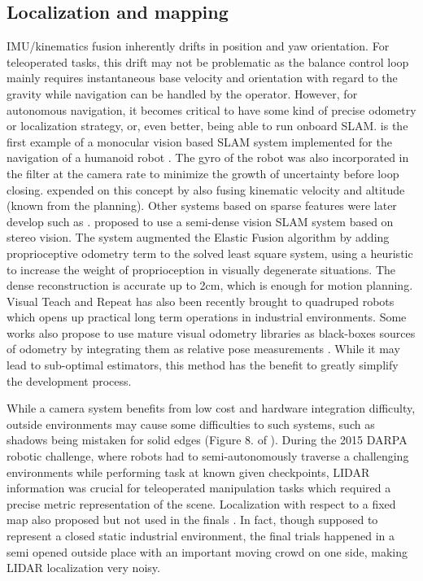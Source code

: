\subsection{Localization and mapping}
IMU/kinematics fusion inherently drifts in position and yaw orientation. For teleoperated tasks, this drift may not be problematic as the balance control loop
mainly requires instantaneous base velocity and orientation with regard to the gravity while navigation can be handled by the operator. However, for autonomous
navigation, it becomes critical to have some kind of precise odometry or localization strategy, or, even better, being able to run onboard SLAM. 
\cite{davison2007monoslam} is the first example of a monocular vision based SLAM system implemented for the navigation of a humanoid robot . The gyro of the robot
was also incorporated in the filter at the camera rate to minimize the growth of uncertainty before loop closing. \cite{stasse2006real} expended on this concept by also fusing
kinematic velocity and altitude (known from the planning). Other systems based on sparse features were later develop such as \cite{ahn2012board, oriolo2012vision, oriolo2016humanoid, kwak20093d}.
\cite{scona2017direct} proposed to use a semi-dense vision SLAM system based on stereo vision. The system augmented the Elastic Fusion \cite{whelan2016elasticfusion} algorithm by adding 
proprioceptive odometry term to the solved least square system, using a heuristic to increase the weight of proprioception in visually degenerate situations. The 
dense reconstruction is accurate up to 2cm, which is enough for motion planning. Visual Teach and Repeat \cite{furgale2010visual} has also been recently brought to quadruped 
robots \cite{mattamala2021learning} which opens up practical long term operations in industrial environments. Some works also propose to use mature visual odometry libraries
as black-boxes sources of odometry by integrating them as relative pose measurements \cite{hartley2018legged,hartley2018hybrid}. While it may lead to sub-optimal estimators, 
this method has the benefit to greatly simplify the development process.

While a camera system benefits from low cost and hardware integration difficulty, outside environments 
may cause some difficulties to such systems, such as shadows being mistaken for solid edges (Figure 8. of \cite{fallon2014drift}).
During the 2015 DARPA robotic challenge, where robots had to semi-autonomously traverse a challenging environments while performing task at known given checkpoints,  
LIDAR information was crucial for teleoperated manipulation tasks \cite{koolen2016design} which required a precise metric representation of the scene. 
Localization with respect to a fixed map also proposed \cite{fallon2014drift} but not used in the finals \cite{fallon2016perception}. In fact, though supposed 
to represent a closed static industrial environment, the final trials happened in a semi opened outside place with an important moving crowd on one side, making
LIDAR localization very noisy. 

